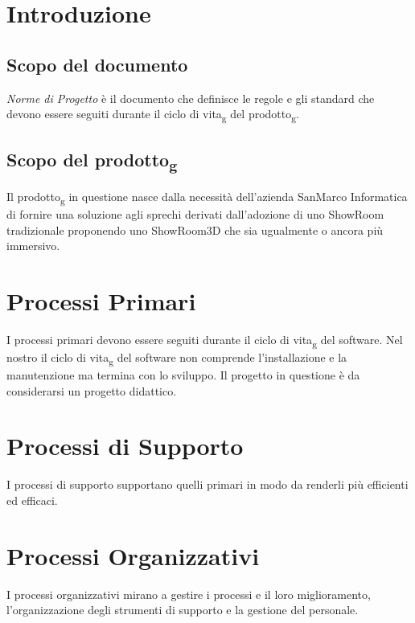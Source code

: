 \documentclass[a4paper]{article}
\begin{document}




\pagebreak

{
    \hypersetup{linkcolor=black}
    \tableofcontents
    \listoffigures %
}
\pagebreak

\section{Introduzione}
\subsection{Scopo del documento}
\textit{Norme di Progetto} è il documento che definisce le regole e gli standard che devono essere seguiti durante il ciclo di vita\textsubscript{g} del prodotto\textsubscript{g}.
\subsection{Scopo del prodotto\textsubscript{g}}
Il prodotto\textsubscript{g} in questione nasce dalla necessità dell'azienda SanMarco Informatica di fornire una soluzione agli sprechi
derivati dall'adozione di uno ShowRoom tradizionale proponendo uno ShowRoom3D che sia ugualmente o ancora più immersivo.
\section{Processi Primari}
I processi primari devono essere seguiti durante il ciclo di vita\textsubscript{g} del software.
Nel nostro il ciclo di vita\textsubscript{g} del software non comprende l'installazione e la manutenzione ma termina con lo sviluppo.
Il progetto in questione è da considerarsi un progetto didattico.

\pagebreak
\section{Processi di Supporto}
I processi di supporto supportano quelli primari in modo da renderli più efficienti ed efficaci.

\pagebreak
\section{Processi Organizzativi}
I processi organizzativi mirano a gestire i processi e il loro miglioramento, l'organizzazione degli strumenti 
di supporto e la gestione del personale.

\pagebreak

\pagebreak

\pagebreak

\pagebreak
\end{document}
